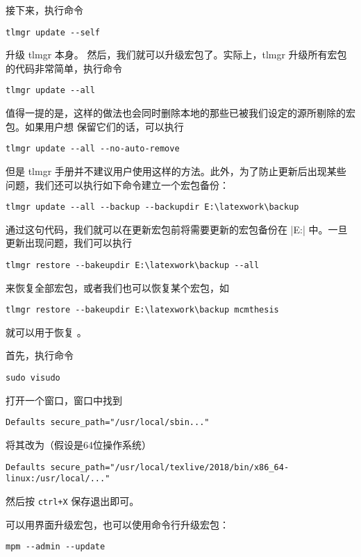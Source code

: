 接下来，执行命令
\begin{verbatim}
tlmgr update --self
\end{verbatim}
升级 tlmgr 本身。 然后，我们就可以升级宏包了。实际上，tlmgr
升级所有宏包的代码非常简单，执行命令
\begin{verbatim}
tlmgr update --all
\end{verbatim}

值得一提的是，这样的做法也会同时删除本地的那些已被我们设定的源所剔除的宏包。如果用户想
保留它们的话，可以执行

\begin{verbatim}
tlmgr update --all --no-auto-remove
\end{verbatim}
但是 tlmgr
手册并不建议用户使用这样的方法。此外，为了防止更新后出现某些问题，我们还可以执行如下命令建立一个宏包备份：

\begin{verbatim}
tlmgr update --all --backup --backupdir E:\latexwork\backup
\end{verbatim}
通过这句代码，我们就可以在更新宏包前将需要更新的宏包备份在
|E:\latexwork\backup| 中。一旦更新出现问题，我们可以执行

\begin{verbatim}
tlmgr restore --bakeupdir E:\latexwork\backup --all
\end{verbatim}
来恢复全部宏包，或者我们也可以恢复某个宏包，如

\begin{verbatim}
tlmgr restore --bakeupdir E:\latexwork\backup mcmthesis
\end{verbatim}
就可以用于恢复 。

首先，执行命令
\begin{verbatim}
sudo visudo
\end{verbatim}
打开一个窗口，窗口中找到
\begin{verbatim}
Defaults secure_path="/usr/local/sbin..."
\end{verbatim}
将其改为（假设是64位操作系统）
\begin{verbatim}
Defaults secure_path="/usr/local/texlive/2018/bin/x86_64-linux:/usr/local/..."
\end{verbatim}
然后按 \verb|ctrl+X| 保存退出即可。


\MiKTeX{}
可以用界面升级宏包，也可以使用命令行升级宏包：
\begin{verbatim}
mpm --admin --update
\end{verbatim}

